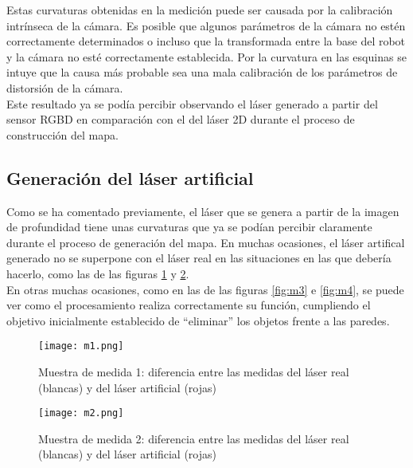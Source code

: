 Estas curvaturas obtenidas en la medición puede ser causada por la calibración intrínseca de la cámara. Es posible que algunos parámetros de la cámara no estén correctamente determinados o incluso que la transformada entre la base del robot y la cámara no esté correctamente establecida. Por la curvatura en las esquinas se intuye que la causa más probable sea una mala calibración de los parámetros de distorsión de la cámara.\\

Este resultado ya se podía percibir observando el láser generado a partir del sensor RGBD en comparación con el del láser 2D durante el proceso de construcción del mapa.\\

\subsection{Generación del láser artificial}

Como se ha comentado previamente, el láser que se genera a partir de la imagen de profundidad tiene unas curvaturas que ya se podían percibir claramente durante el proceso de generación del mapa. En muchas ocasiones, el láser artifical generado no se superpone con el láser real en las situaciones en las que debería hacerlo, como las de las figuras \ref{fig:m1} y \ref{fig:m2}.\\

En otras muchas ocasiones, como en las de las figuras \ref{fig:m3} e \ref{fig:m4}, se puede ver como el procesamiento realiza correctamente su función, cumpliendo el objetivo inicialmente establecido de ``eliminar'' los objetos frente a las paredes.\\

\begin{figure}[H]
	\begin{center} 
		\texttt{[image: m1.png]}
	\end{center}
	\caption{Muestra de medida 1: diferencia entre las medidas del láser real (blancas) y del láser artificial (rojas)}
	\label{fig:m1}
\end{figure}

\begin{figure}[H]
	\begin{center} 
		\texttt{[image: m2.png]}
	\end{center}
	\caption{Muestra de medida 2: diferencia entre las medidas del láser real (blancas) y del láser artificial (rojas)}
	\label{fig:m2}
\end{figure}

